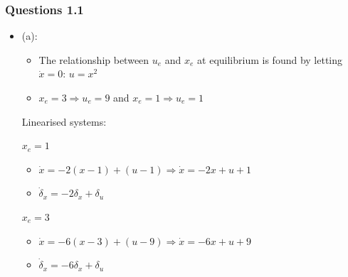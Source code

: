 \documentclass[12pt]{article}
\begin{document}
\subsubsection{Questions 1.1}
\begin{itemize}
    \item (a):
    \begin{itemize}
        \item The relationship between $u_e$ and $x_e$ at equilibrium is found by letting $\dot x = 0$: $u=x^2$
        \item $x_e=3 \Rightarrow u_e=9$ and $x_e=1 \Rightarrow u_e=1$
    \end{itemize}
    Linearised systems:

    $x_e=1$
    \begin{itemize}
        \item $\dot x = -2(x-1)+(u-1) \Rightarrow \dot x = -2x+u+1$
        \item $\dot \delta_x = -2\delta_x + \delta_u$
    \end{itemize}

    $x_e=3$

    \begin{itemize}
        \item $\dot x = -6(x-3)+(u-9) \Rightarrow \dot x = -6x+u+9$
        \item $\dot \delta_x = -6\delta_x + \delta_u$
    \end{itemize}
    

\end{itemize}
\end{document}
